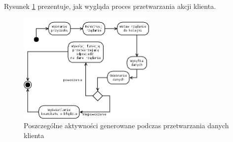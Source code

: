 Rysunek \ref{fig:clientflow} prezentuje, jak wygląda proces przetwarzania akcji klienta.

\begin{figure}[ht]
    \centering
    \includegraphics[width=0.6\textwidth]{imgs/clientflow.png}
    \caption{Poszczególne aktywności generowane podczas przetwarzania danych klienta}
    \label{fig:clientflow}
\end{figure}
